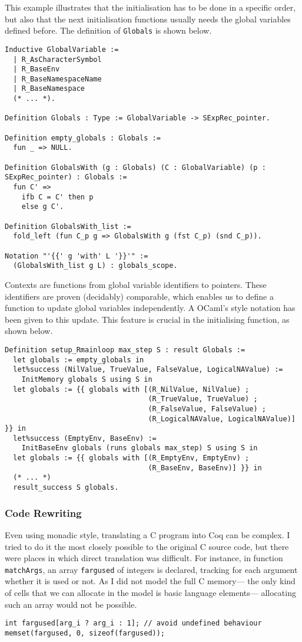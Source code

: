 \documentclass{article}
\newcommand\Coq{Coq}
\newcommand\OCaml{OCaml}
\newcommand\Cn{C}
\begin{document}
This example illustrates that the initialisation has to be done
in a specific order, but also that the next initialisation functions
usually needs the global variables defined before.
The definition of \texttt{Globals} is shown below.
\begin{verbatim}
Inductive GlobalVariable :=
  | R_AsCharacterSymbol
  | R_BaseEnv
  | R_BaseNamespaceName
  | R_BaseNamespace
  (* ... *).

Definition Globals : Type := GlobalVariable -> SExpRec_pointer.

Definition empty_globals : Globals :=
  fun _ => NULL.

Definition GlobalsWith (g : Globals) (C : GlobalVariable) (p : SExpRec_pointer) : Globals :=
  fun C' =>
    ifb C = C' then p
    else g C'.

Definition GlobalsWith_list :=
  fold_left (fun C_p g => GlobalsWith g (fst C_p) (snd C_p)).

Notation "'{{' g 'with' L '}}'" :=
  (GlobalsWith_list g L) : globals_scope.
\end{verbatim}
Contexts are functions from global variable identifiers to pointers.
These identifiers are proven (decidably) comparable,
which enables us to define a function to update global variables independently.
A \OCaml{}’s style notation has been given to this update.
This feature is crucial in the initialising function, as shown below.
\begin{verbatim}
Definition setup_Rmainloop max_step S : result Globals :=
  let globals := empty_globals in
  let%success (NilValue, TrueValue, FalseValue, LogicalNAValue) :=
    InitMemory globals S using S in
  let globals := {{ globals with [(R_NilValue, NilValue) ;
                                  (R_TrueValue, TrueValue) ;
                                  (R_FalseValue, FalseValue) ;
                                  (R_LogicalNAValue, LogicalNAValue)] }} in
  let%success (EmptyEnv, BaseEnv) :=
    InitBaseEnv globals (runs globals max_step) S using S in
  let globals := {{ globals with [(R_EmptyEnv, EmptyEnv) ;
                                  (R_BaseEnv, BaseEnv)] }} in
  (* ... *)
  result_success S globals.
\end{verbatim}


\subsubsection{Code Rewriting}
\label{sec:code:rewriting}

Even using monadic style,
translating a \Cn{} program into \Coq{} can be complex.
I tried to do it the most closely possible to the original
\Cn{} source code,
but there were places in which direct translation was difficult.
For instance, in function \texttt{matchArgs},
an array \texttt{fargused} of integers is declared,
tracking for each argument whether it is used or not.
As I did not model the full \Cn{} memory—%
the only kind of cells that we can allocate in the model
is basic language elements—%
allocating such an array would not be possible.
\begin{verbatim}
int fargused[arg_i ? arg_i : 1]; // avoid undefined behaviour
memset(fargused, 0, sizeof(fargused));
\end{verbatim}
\end{document}
